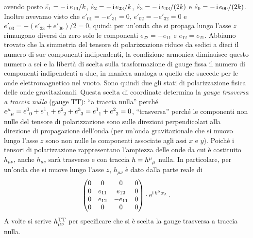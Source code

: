 avendo posto $\tilde{\varepsilon}_{1} = -\operatorname{\mathrm{i}} e_{13}/k$,
$\tilde{\varepsilon}_{2} = -\operatorname{\mathrm{i}} e_{23}/k$,
$\tilde{\varepsilon}_{3} = -\operatorname{\mathrm{i}} e_{33}/(2k)$ e
$\tilde{\varepsilon}_{0} = -\operatorname{\mathrm{i}} e_{00}/(2k)$.  Inoltre avevamo visto che
$e'_{01} = -e'_{31} = 0$, $e'_{02} = -e'_{32} = 0$ e
$e'_{03} = -(e'_{33}+e'_{00})/2 = 0$, quindi per un'onda che si propaga lungo
l'asse $z$ rimangono diversi da zero solo le componenti $e_{22} = -e_{11}$ e
$e_{12} = e_{21}$.  Abbiamo trovato che la simmetria del tensore di
polarizzazione riduce da sedici a dieci il numero di sue componenti
indipendenti, la condizione armonica diminuisce questo numero a sei e la libertà
di scelta sulla trasformazione di gauge fissa il numero di componenti
indipendenti a due, in maniera analoga a quello che succede per le onde
elettromagnetico nel vuoto.  Sono quindi due gli stati di polarizzazione fisica
delle onde gravitazionali.  Questa scelta di coordinate determina la
\emph{gauge trasversa a traccia nulla}
(gauge TT): ``a traccia nulla'' perché
$\tensor{e}{^{\mu}_{\mu}} = \tensor{e}{^{0}_{0}} + \tensor{e}{^{1}_{1}} +
\tensor{e}{^{2}_{2}} + \tensor{e}{^{3}_{3}} = \tensor{e}{^{1}_{1}} +
\tensor{e}{^{2}_{2}} = 0$,
``trasversa'' perché le componenti non nulle del tensore di polarizzazione sono
sulle direzioni perpendicolari alla direzione di propagazione dell'onda (per
un'onda gravitazionale che si muovo lungo l'asse $z$ sono non nulle le
componenti associate agli assi $x$ e $y$).  Poiché i tensori di polarizzazione
rappresentano l'ampiezza delle onde da cui è costituito $h_{\mu\nu}$, anche
$h_{\mu\nu}$ sarà trasverso e con traccia $h = \tensor{h}{^{\mu}_{\mu}}$ nulla.
In particolare, per un'onda che si muove lungo l'asse $z$, $h_{\mu\nu}$ è dato
dalla parte reale di
\begin{equation}
  \begin{pmatrix}
    0 & 0      & 0       & 0 \\
    0 & e_{11} & e_{12}  & 0 \\
    0 & e_{12} & -e_{11} & 0 \\
    0 & 0      & 0       & 0
  \end{pmatrix}\cdot \operatorname{\mathrm{e}}^{\operatorname{\mathrm{i}} k^{\lambda}x_{\lambda}}.
\end{equation}
A volte si scrive $h_{\mu\nu}^{\textup{TT}}$ per specificare che si è scelta la
gauge trasversa a traccia nulla.

